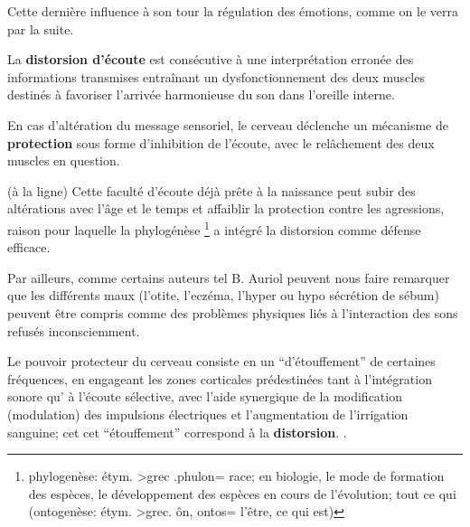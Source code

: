 Cette dernière influence à son tour 
la régulation des émotions, comme on le verra par la suite.




La \textbf{distorsion d'écoute} est consécutive à une interprétation
erronée des informations transmises entraînant un dysfonctionnement
des deux muscles destinés à favoriser l'arrivée
harmonieuse du son dans l'oreille interne.

En cas d'altération du message sensoriel,
le cerveau déclenche un mécanisme de\textbf{ protection} sous forme
d'inhibition de l'écoute, avec le relâchement des deux muscles en
question.

(à la ligne)
Cette faculté d'écoute déjà prête à la naissance peut subir des
altérations avec l'âge et
le temps et affaiblir la protection contre les agressions, raison pour
laquelle la phylogénèse \footnote{ phylogenèse: étym. >grec .phulon=
  race; en biologie, le mode de formation des espèces, le développement
  des espèces en cours de l'évolution; tout ce qui (ontogenèse: étym. >grec. ôn, ontos= l'être,
ce qui est)}  a intégré la distorsion comme défense
efficace.

Par ailleurs, comme certains auteurs tel B. Auriol peuvent nous faire
remarquer que 
les différents maux (l'otite, l'eczéma, l'hyper
ou hypo sécrétion de sébum) peuvent être compris comme des problèmes physiques liés à l'interaction des sons refusés
inconsciemment.  \autocite  [19--20] {auriol:cle}

Le pouvoir protecteur du cerveau consiste en un  ``d'étouffement'' de
certaines fréquences,  en engageant les zones corticales prédestinées
tant à 
l'intégration sonore qu' à l'écoute sélective,  avec l'aide synergique de la
modification (modulation) des impulsions électriques et l'augmentation de
l'irrigation sanguine\autocite [14] {auriol:cle}; cet
cet ``étouffement'' correspond à la
\textbf{distorsion}.
\autocite{tomatis:education}.

  



  




 




  

